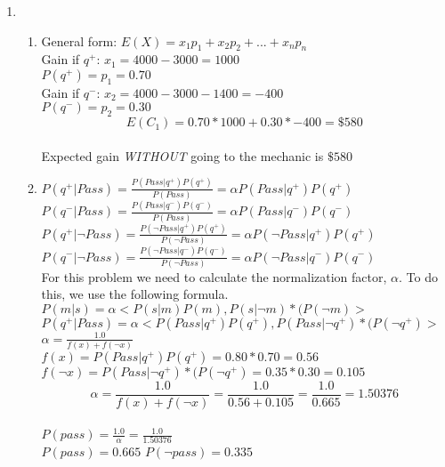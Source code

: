 \documentclass[12pt,a4paper]{report}
\begin{document}
\begin{enumerate}
\pagebreak
\item
\begin{enumerate}
	\item
	General form: $E(X) = x_1p_1 + x_2p_2 + ... + x_np_n$\\
	Gain if $q^+$: $x_1 = 4000 - 3000 = 1000$\\
	$P(q^+) = p_1 = 0.70$\\
	Gain if $q^-$: $x_2 = 4000 - 3000 - 1400 = -400$\\
	$P(q^-)  = p_2 = 0.30$\\
	\[E(C_{1}) = 0.70*1000 + 0.30*-400 = \$580\]\\
	Expected gain \textit{WITHOUT} going to the mechanic is $\$580$\\
	
	\item
	$P(q^{+}|Pass) = \frac{P(Pass|q^{+})P(q^{+})}{P(Pass)} = \alpha P(Pass|q^{+})P(q^{+})$\\
	$P(q^{-}|Pass) = \frac{P(Pass|q^{-})P(q^{-})}{P(Pass)} = \alpha P(Pass|q^{-})P(q^{-})$\\
	$P(q^{+}|\neg Pass) = \frac{P(\neg Pass|q^{+})P(q^{+})}{P(\neg Pass)} = \alpha P(\neg Pass|q^{+})P(q^{+})$\\
	$P(q^{-}|\neg Pass) = \frac{P(\neg Pass|q^{-})P(q^{-})}{P(\neg Pass)} = \alpha P(\neg Pass|q^{-})P(q^{-})$\\
	For this problem we need to calculate the normalization factor, $\alpha$. To do this, we use the following formula.\\
	$P(m|s)=\alpha <P(s|m)P(m),P(s|\neg m)*(P(\neg m)>$\\
	$P(q^{+}|Pass)=\alpha <P(Pass|q^{+})P(q^{+}),P(Pass|\neg q^{+})*(P(\neg q^{+})>$\\
	$\alpha = \frac{1.0}{f(x)+f(\neg x)}$\\
	$f(x) = P(Pass|q^{+})P(q^{+}) = 0.80*0.70 = 0.56$\\
	$f(\neg x) = P(Pass|\neg q^{+})*(P(\neg q^{+}) = 0.35 * 0.30 = 0.105$\\
	\[\alpha = \frac{1.0}{f(x)+f(\neg x)} = \frac{1.0}{0.56+0.105} = \frac{1.0}{0.665} = 1.50376\]\\
	$P(pass) = \frac{1.0}{\alpha} = \frac{1.0}{1.50376}$\\
	$P(pass) = 0.665$ $P(\neg pass) = 0.335$\\
	\\
	\\
	\\
	\\
	

\end{enumerate}
\end{enumerate}
\end{document}
